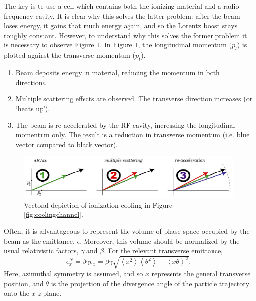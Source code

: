 The key is to use a cell which contains both the ionizing material and a radio frequency cavity. It is clear why this solves the latter problem: after the beam loses energy, it gains that much energy again, and so the Lorentz boost stays roughly constant. However, to understand why this solves the former problem it is necessary to observe Figure \ref{fig:123ionization}. In Figure \ref{fig:123ionization}, the longitudinal momentum ($p_l$) is plotted against the transverse momentum ($p_t$). 
   \begin{enumerate} 
  \item{Beam deposits energy in material, reducing the momentum in both directions.}
  \item{Multiple scattering effects are observed. The transverse direction increases (or `heats up'). }
  \item{The beam is re-accelerated by the RF cavity, increasing the longitudinal momentum only. The result is a reduction in transverse momentum (i.e. blue vector compared to black vector).}
\end{enumerate}

\begin{figure}
  \centering
   \captionsetup{singlelinecheck=off}
    \includegraphics[width=\textwidth]{Figures/123ionization} 
  \caption{Vectoral depiction of ionization cooling in Figure \ref{fig:coolingchannel}. }
  \label{fig:123ionization}
\end{figure}


Often, it is advantageous to represent the volume of phase space occupied by the beam as the emittance, $\epsilon$. Moreover, this volume should be normalized by the usual relativistic factors, $\gamma$ and $\beta$. For the relevant transverse emittance,
%
\begin{equation}
\label{eqn:emittancedef}
\epsilon_x^N=\beta\gamma\epsilon_x=\beta\gamma\sqrt{\left<x^2\right>\left<\theta^2\right>-\left<x\theta\right>^2}.
\end{equation}
%
Here, azimuthal symmetry is assumed, and so $x$ represents the general transverse position, and $\theta$ is the projection of the divergence angle of the particle trajectory onto the $x$-$z$ plane. 

